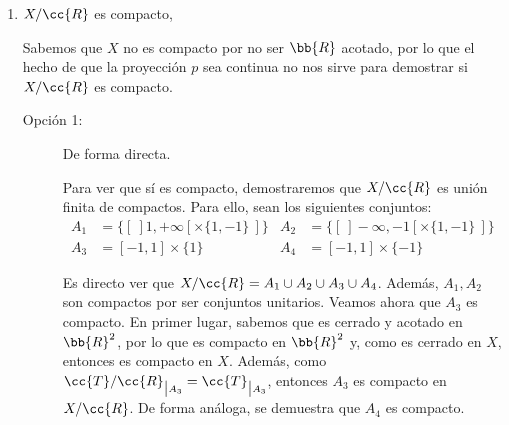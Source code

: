 \documentclass[12pt]{article}
\newcommand{\T}[0]{\cc{T}}
\begin{document}
\begin{ejercicio}[2.5 puntos]
\begin{enumerate}
            Por tanto, no es T2.\\

            Otra opción de ver que no es T2 es ver que tampoco es T1. Para esto, veamos que
            $\{[~]1, +\infty[ \times \{1,-1\}~]\}$ no es cerrado en $X/\cc{R}$.
            
            Buscamos $U\subset X$ saturado y cerrado tal que $p(U) = \{[~]1, +\infty[ \times \{1,-1\}~]\}$.
            El único conjunto saturado de $X$ tal que $p(U) = \{[~]1, +\infty[ \times \{1,-1\}~]\}$ es
            $U = ]1, +\infty[ \times \{1,-1\}$, que no es cerrado, por lo que no existe dicho
            conjunto saturado y cerrado. Por tanto, $\{[~]1, +\infty[ \times \{1,-1\}~]\}$ no es cerrado,
            por lo que $X/\cc{R}$ no es T1, por lo que tampoco es T2.

            \item $X/\cc{R}$ es compacto,
            
            Sabemos que $X$ no es compacto por no ser $\bb{R}$ acotado, por lo que el hecho de que la proyección
            $p$ sea continua no nos sirve para demostrar si $X/\cc{R}$ es compacto.

            \begin{description}
              \item[Opción 1:] De forma directa.
              
              Para ver que sí es compacto, demostraremos que $X/\cc{R}$ es unión finita de compactos.
              Para ello, sean los siguientes conjuntos:
              \begin{align*}
                A_1 &= \{[~]1, +\infty[ \times \{1,-1\}~]\}&
                A_2 &= \{[~]-\infty, -1[ \times \{1,-1\}~]\}
                \\
                A_3 &= [-1,1] \times \{1\}&
                A_4 &= [-1,1] \times \{-1\}
              \end{align*}

              Es directo ver que $X/\cc{R} = A_1 \cup A_2 \cup A_3 \cup A_4$.
              Además, $A_1,A_2$ son compactos por ser conjuntos unitarios.
              Veamos ahora que $A_3$ es compacto. En primer lugar, sabemos que
              es cerrado y acotado en $\bb{R}^2$, por lo que es compacto en $\bb{R}^2$ y,
              como es cerrado en $X$, entonces es compacto en $X$. Además, como
              ${\T/\cc{R}}_{\big|A_3} = \T_{\big|A_3}$, entonces $A_3$ es compacto en
              $X/\cc{R}$. De forma análoga, se demuestra que $A_4$ es compacto.


\end{description}
\end{enumerate}
\end{ejercicio}
\end{document}
